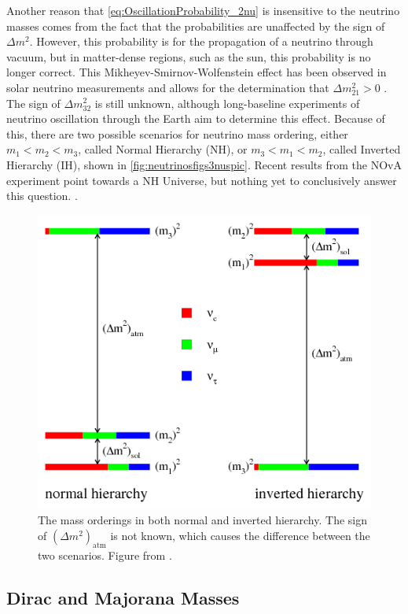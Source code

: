 Another reason that \autoref{eq:OscillationProbability_2nu} is insensitive to the neutrino masses comes from the fact that the probabilities are unaffected by the sign of $\Delta m^2$.
However, this probability is for the propagation of a neutrino through vacuum, but in matter-dense regions, such as the sun, this probability is no longer correct.
This Mikheyev-Smirnov-Wolfenstein effect has been observed in solar neutrino measurements and allows for the determination that $\Delta m_{21}^2>0$ \cite{1367-2630-6-1-139}.
The sign of $\Delta m_{32}^2$ is still unknown, although long-baseline experiments of neutrino oscillation through the Earth aim to determine this effect.
Because of this, there are two possible scenarios for neutrino mass ordering, either $m_1 < m_2 < m_3$, called Normal Hierarchy (NH), or $m_3 < m_1 < m_2$, called Inverted Hierarchy (IH), shown in \autoref{fig:neutrinosfigs3nuspic}.
Recent results from the NOvA experiment point towards a NH Universe, but nothing yet to conclusively answer this question. \cite{Adamson:2017gxd}.
\begin{figure}[tbph]
\centering
\includegraphics[width=0.8\linewidth]{Figures/Neutrinos_figs_3nuspic.png}
\caption[The mass orderings in both normal and inverted hierarchy.]
{The mass orderings in both normal and inverted hierarchy.
The sign of $(\Delta m^2)_{\textrm{atm}}$ is not known, which causes the difference between the two scenarios.
Figure from \cite{Hewett:2012ns}.}
\label{fig:neutrinosfigs3nuspic}
\end{figure}

\subsection{Dirac and Majorana Masses}
\label{ssec:Dirac and Majorana Masses}

